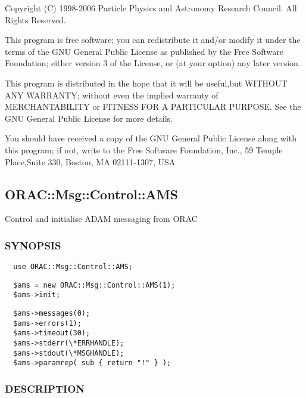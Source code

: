 \begin{description}
Copyright (C) 1998-2006 Particle Physics and Astronomy Research
Council. All Rights Reserved.



This program is free software; you can redistribute it and/or modify it under
the terms of the GNU General Public License as published by the Free Software
Foundation; either version 3 of the License, or (at your option) any later
version.



This program is distributed in the hope that it will be useful,but WITHOUT ANY
WARRANTY; without even the implied warranty of MERCHANTABILITY or FITNESS FOR A
PARTICULAR PURPOSE. See the GNU General Public License for more details.



You should have received a copy of the GNU General Public License along with
this program; if not, write to the Free Software Foundation, Inc., 59 Temple
Place,Suite 330, Boston, MA  02111-1307, USA

\subsection{ORAC::Msg::Control::AMS\label{ORAC::Msg::Control::AMS}}


Control and initialise ADAM messaging from ORAC

\subsubsection*{SYNOPSIS\label{ORAC::Msg::Control::AMS_SYNOPSIS}}
\begin{verbatim}
  use ORAC::Msg::Control::AMS;
\end{verbatim}
\begin{verbatim}
  $ams = new ORAC::Msg::Control::AMS(1);
  $ams->init;
\end{verbatim}
\begin{verbatim}
  $ams->messages(0);
  $ams->errors(1);
  $ams->timeout(30);
  $ams->stderr(\*ERRHANDLE);
  $ams->stdout(\*MSGHANDLE);
  $ams->paramrep( sub { return "!" } );
\end{verbatim}
\subsubsection*{DESCRIPTION\label{ORAC::Msg::Control::AMS_DESCRIPTION}}



\end{description}
